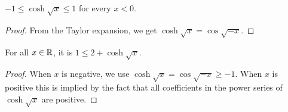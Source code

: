 
\begin{lemma}
  \label{lem:coshsqrt-bd-neg}
  \leanok
  $-1 \le \cosh \sqrt{x} \le 1$ for every $x < 0$.
\end{lemma}
%
\begin{proof}
  From the Taylor expansion, we get $\cosh \sqrt{x} = \cos \sqrt{-x}$.
\end{proof}


\begin{lemma}
  \label{lem:le-coshsqrt} %
  \leanok
  For all $x \in \mathbb{R}$, it is $1 \le 2 + \cosh\sqrt{x}$.
\end{lemma}
%
\begin{proof}
  When $x$ is negative, we use $\cosh \sqrt{x} = \cos \sqrt{-x}\ge -1$. When $x$ is positive this is implied by the fact that all coefficients in the power series of $\cosh \sqrt{x}$ are positive.
\end{proof}


